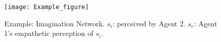 \begin{figure}[ht]
\vskip -0.2in
\begin{center}
\centerline{\texttt{[image: Example\_figure]}}
\caption{Example: Imagination Network. $s_{i}$: perceived by Agent 2. $s_e$: Agent 1's empathetic perception of $s_{i}$.}
\label{fig:emp_example}
\end{center}
\vskip -0.3in
\end{figure}


